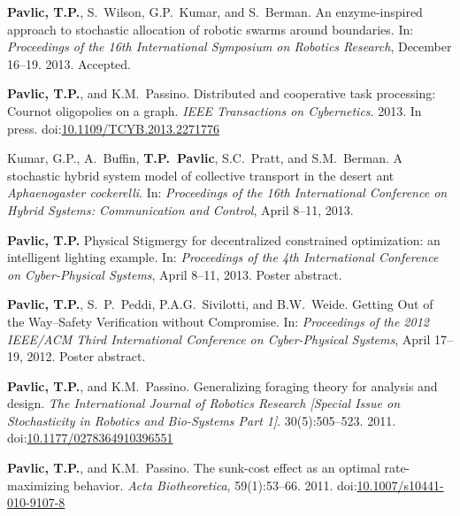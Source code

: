 \documentclass[svgnames,11pt]{article}
\newcommand\doilink[1]{\href{http://dx.doi.org/#1}{#1}}
\newcommand\doi[1]{doi:\doilink{#1}}
\begin{document}
\begin{bibenum}[itemsep=5pt]

    \item \textbf{Pavlic, T.P.}, S.~Wilson, G.P.~Kumar, and S.~Berman.
        An enzyme-inspired approach to stochastic allocation of robotic
        swarms around boundaries. In: \emph{Proceedings of the 16th
        International Symposium on Robotics Research},
        December 16--19. 2013. Accepted.

    \item \textbf{Pavlic, T.P.}, and K.M.~Passino. Distributed and
        cooperative task processing: Cournot oligopolies on a graph.
        \emph{IEEE Transactions on Cybernetics}. 2013. In press.
        \doi{10.1109/TCYB.2013.2271776}

    \item Kumar, G.P., A.~Buffin, \textbf{T.P.~Pavlic}, S.C.~Pratt, and
        S.M.~Berman. A stochastic hybrid system model of collective
        transport in the desert ant \emph{Aphaenogaster cockerelli}. In:
        \emph{Proceedings of the 16th International Conference on Hybrid
        Systems: Communication and Control}, April 8--11,
        2013.

    \item \textbf{Pavlic, T.P.} Physical Stigmergy for decentralized
        constrained optimization: an intelligent lighting example. In:
        \emph{Proceedings of the 4th International Conference on
        Cyber-Physical Systems}, April 8--11, 2013.
        Poster abstract.

    \item \textbf{Pavlic, T.P.}, S.~P.~Peddi, P.A.G.~Sivilotti, and B.W.~Weide.
        Getting Out of the Way--Safety Verification without Compromise.
        In: \emph{Proceedings of the 2012 IEEE/ACM Third International
        Conference on Cyber-Physical Systems}, April
        17--19, 2012. Poster abstract.

    \item \textbf{Pavlic, T.P.}, and K.M.~Passino. Generalizing foraging theory
        for analysis and design. \emph{The International Journal of
        Robotics Research [Special Issue on Stochasticity in Robotics
        and Bio-Systems Part 1]}. 30(5):505--523. 2011.
        \doi{10.1177/0278364910396551}

    \item \textbf{Pavlic, T.P.}, and K.M.~Passino. The sunk-cost effect as an
        optimal rate-maximizing behavior. \emph{Acta Biotheoretica},
        59(1):53--66. 2011. \doi{10.1007/s10441-010-9107-8}


\end{bibenum}
\end{document}
